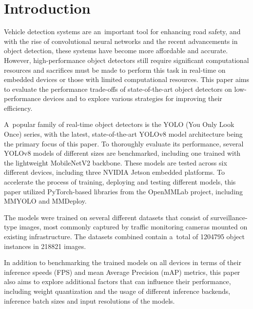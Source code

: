 % 




\newpage
\chapter{Introduction}

Vehicle detection systems are an~important tool for enhancing road safety, and
with the rise of convolutional neural networks and the recent advancements in
object detection, these systems have become more affordable and accurate.
However, high-performance object detectors still require significant
computational resources and sacrifices must be made to perform this task in
real-time on embedded devices or those with limited computational resources.
This paper aims to evaluate the performance trade-offs of state-of-the-art
object detectors on low-performance devices and to explore various strategies
for improving their efficiency.

A~popular family of real-time object detectors is the YOLO (You Only Look Once)
series, with the latest, state-of-the-art YOLOv8 model architecture being the
primary focus of this paper. To thoroughly evaluate its performance, several
YOLOv8 models of different sizes are benchmarked, including one trained with the
lightweight MobileNetV2 backbone. These models are tested across six different
devices, including three NVIDIA Jetson embedded platforms. To accelerate the
process of training, deploying and testing different models, this paper utilized
PyTorch-based libraries from the OpenMMLab project, including MMYOLO and
MMDeploy.

The models were trained on several different datasets that consist of
surveillance-type images, most commonly captured by traffic monitoring cameras
mounted on existing infrastructure. The datasets combined contain a~total of
\num{1204795} object instances in \num{218821} images.

In addition to benchmarking the trained models on all devices in terms of their
inference speeds (FPS) and mean Average Precision (mAP) metrics, this paper also
aims to explore additional factors that can influence their performance,
including weight quantization and the usage of different inference backends,
inference batch sizes and input resolutions of the models.

